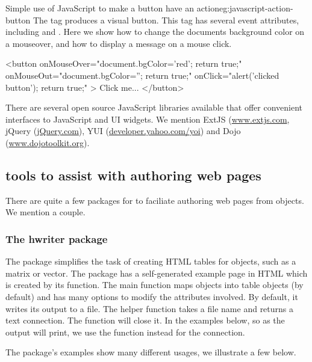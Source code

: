 \begin{example}{Simple use of JavaScript to make a button have an action}{eg:javascript-action-button}
  The  tag produces a visual button. This tag has several
  event attributes, including  and
  . Here we show how to change the documents background
  color on a mouseover, and how to display a message on a mouse click.
  \begin{HTMLinput}
<button
  onMouseOver="document.bgColor='red'; return true;"
  onMouseOut="document.bgColor=''; return true;"
  onClick="alert('clicked button'); return true;" >
  Click me...
</button>
 \end{HTMLinput}
\end{example}

There are several open source JavaScript libraries available that
offer convenient interfaces to JavaScript and UI widgets. We
mention ExtJS (\url{www.extjs.com}, jQuery (\url{jQuery.com}), YUI
(\url{developer.yahoo.com/yoi}) and Dojo
(\url{www.dojotoolkit.org}). 


\subsection{\R\/ tools to assist with authoring web pages}
\label{sec:r-tools-authoring}

There are quite a few packages for \R\/ to faciliate authoring web pages from
\R\/ objects. We mention a couple.

\subsubsection{The hwriter package}
\label{sec:hwriter-package}


The  package simplifies the task of creating HTML tables
for \R\/ objects, such as a matrix or vector. The package has a
self-generated example page in HTML which is created by its
 function. The main function 
maps \R\/ objects into table objects (by default) and has many options
to modify the attributes involved. By default, it writes its output to
a file. The helper function  takes a file name and
returns a text connection. The  function will
close it. In the examples below, so as the output will print, we use the  function instead
for the connection.

The package's examples show many different usages, we illustrate a few below.

